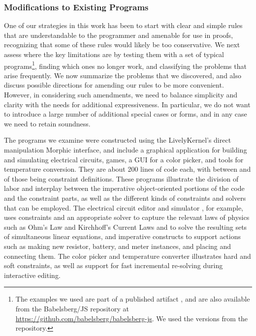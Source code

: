\documentclass[10pt,reprint]{sigplanconf-preprint}
\begin{document}
\subsubsection*{Modifications to Existing Programs}
\label{sec:exist-appl}

One of our strategies in this work has been to start with clear and
simple rules that are understandable to the programmer and amenable
for use in proofs, recognizing that some of these rules would likely
be too conservative.  We next assess where the key limitations are by
testing them with a set of typical programs\footnote{The examples we
  used are part of a published artifact \cite{FelgentreffECOOP14}, and
  are also available from the Babelsberg/JS repository at
  \url{https://github.com/babelsberg/babelsberg-js}.
  We used the versions from the repository.}, finding
which ones no longer work, and classifying the problems that arise
frequently.  We now summarize the problems that we discovered, and
also discuss possible directions for amending our rules to be more
convenient. However, in considering such amendments, we need to
balance simplicity and clarity with the needs for additional
expressiveness.  In particular, we do not want to introduce a large
number of additional special cases or forms, and in any case we need
to retain soundness.

The programs we examine were constructed using the LivelyKernel's
direct manipulation Morphic interface, and include a graphical
application for building and simulating electrical circuits, games, a
GUI for a color picker, and tools for temperature conversion. They are
about 200 lines of code each, with between  and
 of those being constraint definitions. These programs
illustrate the division of labor and interplay between the imperative
object-oriented portions of the code and the constraint parts, as well
as the different kinds of constraints and solvers that can be
employed. The electrical circuit editor and simulator
\cite{FelgentreffECOOP14}, for example, uses constraints and an
appropriate solver to capture the relevant laws of physics such as
Ohm's Law and Kirchhoff's Current Laws and to solve the resulting sets
of simultaneous linear equations, and imperative constructs to support
actions such as making new resistor, battery, and meter instances, and
placing and connecting them.  %
The color picker and temperature converter \cite{FelgentreffECOOP14}
illustrates hard and soft constraints, as well as support for fast
incremental re-solving during interactive
editing.  %
\end{document}
